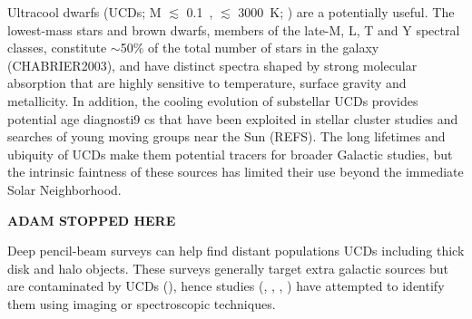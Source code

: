 \documentclass[manuscript]{aastex}
\begin{document}
Ultracool dwarfs (UCDs; M $\lesssim$ 0.1~\Msun, {\teff} $\lesssim$ 3000~K;  \citealt{2005ARA&A..43..195K}) are a potentially useful.
The lowest-mass stars and brown dwarfs, members of the late-M, L, T and Y spectral classes, 
constitute $\sim$50\% of the total number of stars in the galaxy (CHABRIER2003), and have distinct spectra shaped by strong molecular absorption that are highly sensitive to temperature, surface gravity and metallicity. In addition, the cooling evolution of substellar UCDs provides potential age diagnosti9 cs that have been exploited in stellar cluster studies \citep{1998ASPC..134..394B,luhman2012,martin2017} and searches of young moving groups near the Sun (REFS). The long lifetimes and ubiquity of UCDs make them potential tracers for broader Galactic studies, but the intrinsic faintness of these sources has limited their use beyond the immediate Solar Neighborhood.

{\bf ADAM STOPPED HERE}

 

Deep pencil-beam surveys can help find distant populations UCDs  including thick disk and halo objects. These surveys  generally target extra galactic sources but are  contaminated by UCDs (\citealt{2008A&A...488..181C}), hence studies  (\citealt{Konishi2014}, \citealt{stanway16}, \citealt{Vledder2016}, \citealt{Ryan2011} ) have attempted to identify them using imaging or spectroscopic techniques.
\end{document}
